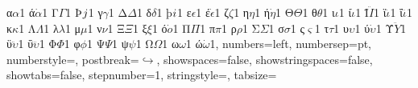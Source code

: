 {		{α}{{$\alpha$}}1 {ά}{{$\dot \alpha$}}1 {Γ}{{$\Gamma$}}1 {Þ}{{$\Thorn$}}1
		{γ}{{$\gamma$}}1 {Δ}{{$\Delta$}}1 {δ}{{$\delta$}}1 {þ}{{$\thorn$}}1
		{ε}{{$\epsilon$}}1 {έ}{{$\dot \epsilon$}}1 {ζ}{{$\zeta$}}1
		{η}{{$\eta$}}1 {ή}{{$\dot \eta$}}1 {Θ}{{$\Theta$}}1
		{θ}{{$\theta$}}1 {ι}{{$\iota$}}1 {ί}{{$\dot \iota$}}1
		{Ϊ}{{$\ddot I$}}1 {ϊ}{{$\ddot \iota$}}1 {ΐ}{{$\dddot \iota$}}1
		{κ}{{$\kappa$}}1 {Λ}{{$\Lambda$}}1 {λ}{{$\lambda$}}1
		{μ}{{$\mu$}}1 {ν}{{$\nu$}}1 {Ξ}{{$\Xi$}}1 {ξ}{{$\xi$}}1
		{ό}{{$\dot o$}}1 {Π}{{$\Pi$}}1 {π}{{$\pi$}}1 {ρ}{{$\rho$}}1
		{Σ}{{$\Sigma$}}1 {σ}{{$\sigma$}}1 {ς}{{$\varsigma$}}1 {τ}{{$\tau$}}1
		{υ}{{$\upsilon$}}1 {ύ}{{$\dot \upsilon$}}1 {Ϋ}{{$\ddot Y$}}1
		{ϋ}{{$\ddot \upsilon$}}1 {ΰ}{{$\dddot \upsilon$}}1
		{Φ}{{$\Phi$}}1 {φ}{{$\phi$}}1 {Ψ}{{$\Psi$}}1 {ψ}{{$\psi$}}1
		{Ω}{{$\Omega$}}1 {ω}{{$\omega$}}1 {ώ}{{$\dot \omega$}}1,
	numbers=left,
	numbersep={\sourcecodenumbersep pt},
	numberstyle=\tiny\color{dkgray},
	postbreak=\mbox{$\hookrightarrow$\space},
	showspaces=false,
	showstringspaces=false,
	showtabs=false,
	stepnumber=1,
	stringstyle=\color{mauve},
	tabsize={\sourcecodetabsize}
}

